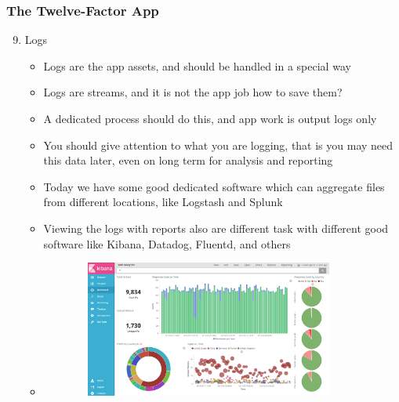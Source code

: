 \documentclass{beamer}
\begin{document}
	\begin{frame}
		\frametitle{The Twelve-Factor App}
			\begin{enumerate}
				\setcounter{enumi}{8}
				\item Logs \\
				\begin{itemize}
					\item<1->[] \scriptsize{Logs are the app assets, and should be handled in a special way}
					\item<2-> \scriptsize {Logs are streams, and it is not the app job how to save them?}
					\item<3-> \scriptsize {A dedicated process should do this, and app work is output logs only}
					\item<4-> \scriptsize {You should give attention to what you are logging, that is you may need this data later, even on long term for analysis and reporting}
					\item<5-> \scriptsize {Today we have some good dedicated software which can aggregate files from different locations, like Logstash and Splunk}
					\item<6-> \scriptsize {Viewing the logs with reports also are different task with different good software like Kibana, Datadog, Fluentd, and others }
					\item<2->[]
					\begin{figure}[h]
						\includegraphics[width=90mm,height= 45mm, scale=1]{img/logs.png}
					\end{figure}
				\end{itemize}
			\end{enumerate}
			\vspace{100mm}
	\end{frame}
\end{document}

